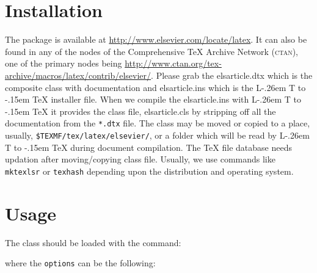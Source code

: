 \documentclass[a4paper,12pt]{article}
\makeatletter
\def\file#1{\textsf{#1}\xspace}
\DeclareRobustCommand{\LaTeX}{L\kern-.26em%
        {\sbox\z@ T%
         \vbox to\ht\z@{\hbox{\check@mathfonts
           \fontsize\sf@size\z@
           \math@fontsfalse\selectfont
          A\,}%
         \vss}%
        }%
     \kern-.15em%
    \TeX}
\makeatother
\begin{document}
\section{Installation}
\hypertarget{installation}{}

The package is available at
\url{http://www.elsevier.com/locate/latex}.
It can also be found in any of the nodes of the Comprehensive
\TeX{} Archive Network (\textsc{ctan}), one of the primary nodes
being
\url{http://www.ctan.org/tex-archive/macros/latex/contrib/elsevier/}.
Please grab the \file{elsarticle.dtx} which is the composite
class with documentation and \file{elsarticle.ins} which is the
\LaTeX{} installer file. When we compile the
\file{elsarticle.ins} with \LaTeX{} it provides the class file,
\file{elsarticle.cls} by
stripping off all the documentation from the \verb+*.dtx+ file.
The class may be moved or copied to a place, usually,
\texttt{\$TEXMF/tex/latex/elsevier/}, or a folder which will be read
by \LaTeX{} during document compilation.  The \TeX{} file
database needs updation after moving/copying class file.  Usually,
we use commands like \verb+mktexlsr+ or \verb+texhash+ depending
upon the distribution and operating system.


\section{Usage}\label{sec:usage}
\hypertarget{usage}{}
The class should be loaded with the command:


where the \verb+options+ can be the following:
\end{document}
